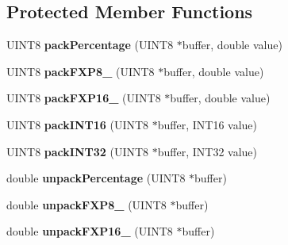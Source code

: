\subsection*{\-Protected \-Member \-Functions}
\begin{DoxyCompactItemize}
\item 
\hypertarget{classCANJaguar_a2ae92b399f3ed7894c18216ab18de7cb}{\-U\-I\-N\-T8 {\bfseries pack\-Percentage} (\-U\-I\-N\-T8 $\ast$buffer, double value)}\label{classCANJaguar_a2ae92b399f3ed7894c18216ab18de7cb}

\item 
\hypertarget{classCANJaguar_acf94b677ffbeb4829698c8b48527b296}{\-U\-I\-N\-T8 {\bfseries pack\-F\-X\-P8\-\_} (\-U\-I\-N\-T8 $\ast$buffer, double value)}\label{classCANJaguar_acf94b677ffbeb4829698c8b48527b296}

\item 
\hypertarget{classCANJaguar_a61dcba690fc6e4112025cdf6ad48e92c}{\-U\-I\-N\-T8 {\bfseries pack\-F\-X\-P16\-\_} (\-U\-I\-N\-T8 $\ast$buffer, double value)}\label{classCANJaguar_a61dcba690fc6e4112025cdf6ad48e92c}

\item 
\hypertarget{classCANJaguar_ac9fdbc82dd563db0986da50e7ed5645f}{\-U\-I\-N\-T8 {\bfseries pack\-I\-N\-T16} (\-U\-I\-N\-T8 $\ast$buffer, \-I\-N\-T16 value)}\label{classCANJaguar_ac9fdbc82dd563db0986da50e7ed5645f}

\item 
\hypertarget{classCANJaguar_af4b4aca16cf31c567c2723b336e4d5c4}{\-U\-I\-N\-T8 {\bfseries pack\-I\-N\-T32} (\-U\-I\-N\-T8 $\ast$buffer, \-I\-N\-T32 value)}\label{classCANJaguar_af4b4aca16cf31c567c2723b336e4d5c4}

\item 
\hypertarget{classCANJaguar_a41db61754a1691983a07401162801f7c}{double {\bfseries unpack\-Percentage} (\-U\-I\-N\-T8 $\ast$buffer)}\label{classCANJaguar_a41db61754a1691983a07401162801f7c}

\item 
\hypertarget{classCANJaguar_a0fa1e85c76cf2f00c3536998f1a1fe7b}{double {\bfseries unpack\-F\-X\-P8\-\_} (\-U\-I\-N\-T8 $\ast$buffer)}\label{classCANJaguar_a0fa1e85c76cf2f00c3536998f1a1fe7b}

\item 
\hypertarget{classCANJaguar_afea6d8c7d2b715eab607ffb62ac5e166}{double {\bfseries unpack\-F\-X\-P16\-\_} (\-U\-I\-N\-T8 $\ast$buffer)}\label{classCANJaguar_afea6d8c7d2b715eab607ffb62ac5e166}


\end{DoxyCompactItemize}

